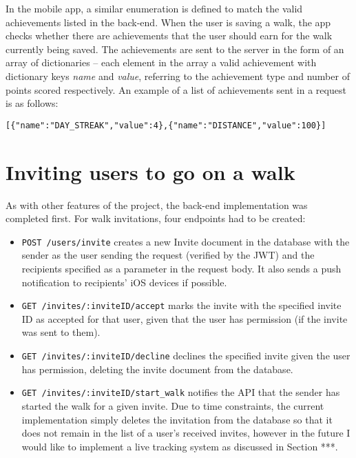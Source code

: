 In the mobile app, a similar enumeration is defined to match the valid achievements listed in the back-end. When the user is saving a walk, the app checks whether there are achievements that the user should earn for the walk currently being saved. The achievements are sent to the server in the form of an array of dictionaries -- each element in the array a valid achievement with dictionary keys \textit{name} and \textit{value}, referring to the achievement type and number of points scored respectively. An example of a list of achievements sent in a request is as follows:

\begin{center}
  \verb|[{"name":"DAY_STREAK","value":4},{"name":"DISTANCE","value":100}]|
\end{center}


\section{Inviting users to go on a walk}


As with other features of the project, the back-end implementation was completed first. For walk invitations, four endpoints had to be created:

\begin{itemize}
  \item \verb|POST /users/invite| creates a new Invite document in the database with the sender as the user sending the request (verified by the JWT) and the recipients specified as a parameter in the request body. It also sends a push notification to recipients' iOS devices if possible.

  \item \verb|GET /invites/:inviteID/accept| marks the invite with the specified invite ID as accepted for that user, given that the user has permission (if the invite was sent to them).

  \item \verb|GET /invites/:inviteID/decline| declines the specified invite given the user has permission, deleting the invite document from the database.

  \item \verb|GET /invites/:inviteID/start_walk| notifies the API that the sender has started the walk for a given invite. Due to time constraints, the current implementation simply deletes the invitation from the database so that it does not remain in the list of a user's received invites, however in the future I would like to implement a live tracking system as discussed in Section ***.
\end{itemize}

